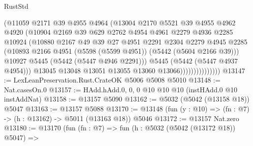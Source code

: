 \begin{lexlean}{RustStd}
\begin{coremodule}
{\begin{coremodule}
{{{{{{{{{{{{                              (@11059
                                @2171
                                @39
                                @4955
                                @4964
                                (@13004
                                  @2170
                                  @5521
                                  @39
                                  @4955
                                  @4962
                                  @4920
                                  (@10904
                                    @2169
                                    @39
                                    @629
                                    @2762
                                    @4954
                                    @4961
                                    @2279
                                    @4936
                                    @2285
                                    @10924
                                    (@10880
                                      @2167
                                      @49
                                      @39
                                      @27
                                      @4951
                                      @2291
                                      @2304
                                      @2279
                                      @4945
                                      @2285
                                      (@10893
                                        @2166
                                        @4951
                                        (@5598 (@5599 @4951))
                                        (@5442 (@5604 @2166 @39)))
                                      @10927
                                      @5445
                                      (@5442 (@5447 @4946 @2291)))
                                    @5445
                                    (@5442 (@5447 @4937 @4954)))
                                  @13045
                                  @13048
                                  @13051
                                  @13055
                                  @13060
                                  @13066)))))))))))))))
@13147 := LexLeanPreservation.Rust.CrateOK @5006 @5008 @5010
@13148 := Nat.casesOn.{0}
@13157 := HAdd.hAdd.{0, 0, 0} @10 @10 @10 (instHAdd.{0} @10 instAddNat)
@13158 := @13157 @5090
@13162 := @5032 (@5042 (@13158 @18)) @5047
@13163 := @13157 @5088
@13170 := @13148 (fun (y : @10) => (fn : @7) -> (h : @13162) -> @5011 (@13163 @18)) @5046
@13172 := @13157 Nat.zero
@13180 := @13170
    (fun (fn : @7) =>
    fun (h : @5032 (@5042 (@13172 @18)) @5047) =>
}}}}}}}}}}}}
\end{coremodule}}
\end{coremodule}
\end{lexlean}
